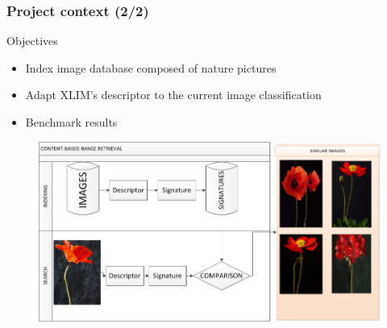 \documentclass[xcolor=table]{beamer}
\begin{document}
\begin{frame} \frametitle{Project context (2/2)}
\begin{block}{Objectives}
    \begin{itemize}
        \item Index image database composed of nature pictures
        \item Adapt XLIM's descriptor to the current image classification
        \item Benchmark results
    \end{itemize}
\end{block}
	
\begin{figure}
	\includegraphics[scale=0.38]{CBIR.png}
\end{figure}

\end{frame}


\end{document}
